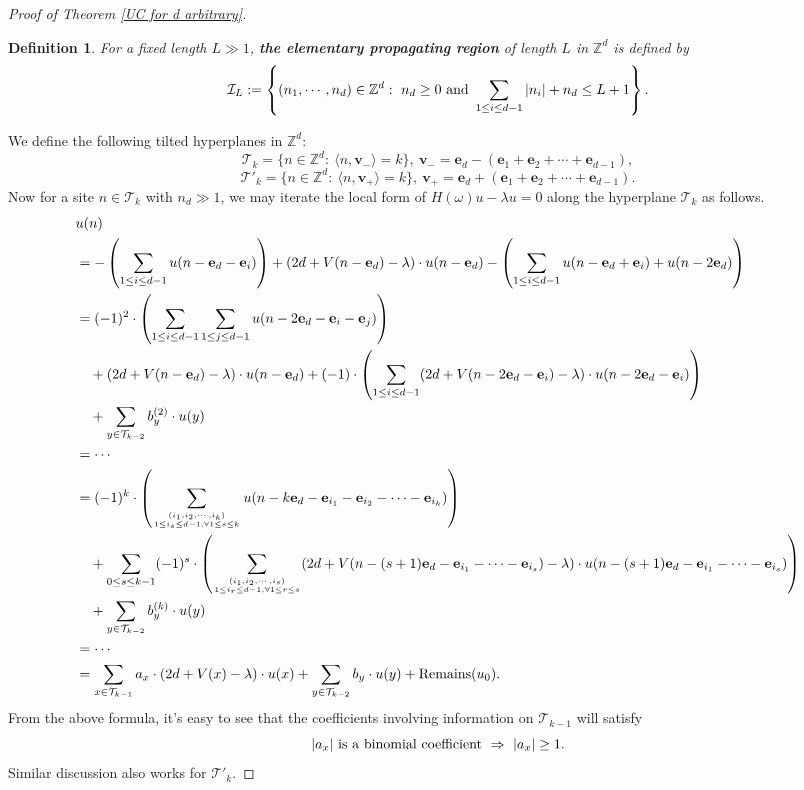 \documentclass[11pt,reqno,UTF8,twoside]{amsart}
\newcommand{\Z}{\mathbb{Z}}
\newcommand{\bfv}{\mathbf{v}}
\newcommand{\bfe}{\mathbf{e}}
\newcommand{\mcI}{\mathcal{I}}
\newcommand{\mcT}{\mathcal{T}}
\newtheorem{Def}{Definition}[section]
\theoremstyle{definition}
\numberwithin{equation}{section}
\begin{document}
\begin{proof}[Proof of Theorem \ref{UC for d arbitrary}]
\begin{Def}
For a fixed length $L\gg 1$, \textbf{the elementary propagating region} of length $L$ in $\Z^d$ is defined by 
\[\mcI_L := \left\{ (n_1,\cdots,n_d)\in \Z^d: \ n_d\geq 0 \ {\rm and }\ \sum_{1\leq i \leq d-1} |n_i|+ n_d \leq L+1    \right\}. \]   
\end{Def}
We define the following tilted hyperplanes in $\Z^d$:
 \[\mcT_k=\{n\in \Z^d:\  \langle n,\bfv_-\rangle = k\}, \ \bfv_-=\bfe_d-(\bfe_1+\bfe_2+\cdots+\bfe_{d-1}),\]
\[\mcT'_k=\{n\in \Z^d: \ \langle n,\bfv_+\rangle = k\}, \ \bfv_+=\bfe_d+(\bfe_1+\bfe_2+\cdots+\bfe_{d-1}).\]
Now for a site $n\in \mcT_k$ with $n_d\gg 1$, we may iterate the local form of  $H(\omega)u-\lambda u=0$ along the hyperplane $\mcT_k$ as follows. 
{\Small\begin{align}
\notag &u(n) \\
\notag  &= -\left(\sum_{1\leq i\leq d-1}u(n-\bfe_d -\bfe_i) \right) + (2d+V(n-\bfe_d)-\lambda)\cdot u(n-\bfe_d) -\left(\sum_{1\leq i\leq d-1} u(n-\bfe_d+\bfe_i)+u(n-2\bfe_d)\right)\\
\notag   &= (-1)^2 \cdot  \left(\sum_{1\leq i\leq d-1} \sum_{1\leq j\leq d-1} u(n-2\bfe_d-\bfe_i-\bfe_j)\right)\\
\notag   &\quad +(2d+V(n-\bfe_d)-\lambda)\cdot u(n-\bfe_d) +(-1)\cdot \left(\sum_{1\leq i\leq d-1}  (2d+V(n-2\bfe_d-\bfe_i)-\lambda)\cdot u(n-2\bfe_d -\bfe_i) \right) \\
 \notag  &\quad + \sum_{y\in \mcT_{k-2}} b_y^{(2)} \cdot u(y)\\
 \notag  & =\cdots \\
 \notag  &= (-1)^k \cdot  \left(\sum_{(i_1,i_2,\cdots,i_k) \atop 1\leq i_s \leq d-1 ,\forall 1\leq s\leq k}  u(n-k\bfe_d-\bfe_{i_1}-\bfe_{i_2}-\cdots-\bfe_{i_k})\right)\\
 \label{d dim expansion}  &\quad +\sum_{0\leq s\leq k-1}(-1)^{s}\cdot \left(\sum_{(i_1,i_2,\cdots,i_{s})  \atop 1\leq i_r \leq d-1 ,\forall 1\leq r\leq s }  (2d+V(n-(s+1)\bfe_d -\bfe_{i_1}-\cdots -\bfe_{i_s})-\lambda)\cdot u(n-(s+1)\bfe_d -\bfe_{i_1}-\cdots -\bfe_{i_s}) \right) \\
\notag   &\quad + \sum_{y\in \mcT_{k-2}} b_y^{(k)} \cdot u(y)\\
 \notag  &=\cdots\\
 \notag  &=\sum_{x\in \mcT_{k-1}} a_x \cdot (2d+V(x)-\lambda) \cdot u(x)  +\sum_{y\in \mcT_{k-2}} b_y \cdot u(y) + {\rm Remains}(u_0).
\end{align}}
From the above formula, it's easy to see that the coefficients  involving information on $\mcT_{k-1}$ will satisfy 
\[|a_x| {\rm \ is \ a \ binomial \ coefficient }\ \Rightarrow \ |a_x|\geq 1.\]
Similar discussion also works for $\mcT'_k$.


\end{proof}
\end{document}
